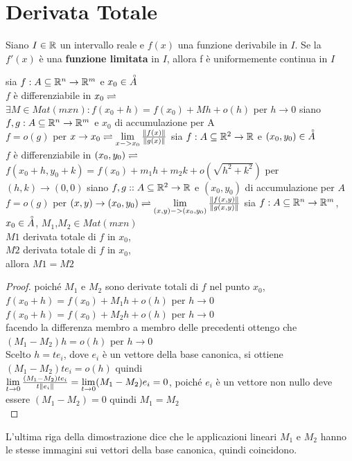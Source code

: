 \section{Derivata Totale}
\begin{proposition} %
	\label{prop:if_df_lim_then_unif_cont}
	Siano $I \in \mathbb{R}$ un intervallo reale e $f(x)$ una funzione derivabile in $I$. Se la $f'(x)$ è una \textbf{funzione limitata} in $I$, allora f è uniformemente continua in $I$
\end{proposition}
sia $f:A\subseteq \mathbb{R}^n\rightarrow \mathbb{R}^m$ e $x_0\in\accentset{\circ}{A}$ \\
$f$ è differenziabile in $x_0\rightleftharpoons$ $\exists M\in Mat(mxn) : f(x_0+h) = f(x_0)+Mh+o(h)$ per $h\rightarrow 0$ 
siano $f,g : A\subseteq \mathbb{R}^n\rightarrow \mathbb{R}^m$ e $x_0$ di accumulazione per A \\
$f=o(g)$ per $x\rightarrow x_0 \rightleftharpoons \lim\limits_{x->x_0}\frac{\left\|f(x)\right\| }{\left\|g(x)\right\| }$
sia $f:A\subseteq \mathbb{R}^2\rightarrow \mathbb{R}$ e $(x_0,y_0)\in\accentset{\circ}{A}$ \\
$f$ è differenziabile in $(x_0,y_0)\rightleftharpoons$ $f(x_0+h,y_0+k) = f(x_0)+m_1h+m_2k+o(\sqrt{h^2+k^2})$ per $(h,k)\rightarrow (0,0)$
siano $f,g : :A\subseteq \mathbb{R}^2\rightarrow \mathbb{R}$ e $(x_0,y_0)$ di accumulazione per $A$ \\
$f=o(g)$ per $(x,y)\rightarrow (x_0,y_0) \rightleftharpoons \lim\limits_{(x,y)->(x_0,y_0)}\frac{\left\|f(x,y)\right\| }{\left\|g(x,y)\right\| }$
sia $f:A\subseteq \mathbb{R}^n\rightarrow \mathbb{R}^m$, $x_0\in\accentset{\circ}{A}$, $M_1$,$M_2\in Mat(mxn)$\\
$M1$ derivata totale di $f$ in $x_0$,\\
$M2$ derivata totale di $f$ in $x_0$,\\
allora $M1=M2$\\
\begin{proof}
	poiché $M_1$ e $M_2$ sono derivate totali di $f$ nel punto $x_0$,\\
	$f(x_0+h) = f(x_0)+M_1h+o(h)$ per $h\rightarrow 0$\\
	$f(x_0+h) = f(x_0)+M_2h+o(h)$ per $h\rightarrow 0$\\
	facendo la differenza membro a membro delle precedenti ottengo che $(M_1-M_2)h=o(h)$ per $h\rightarrow 0$\\
	Scelto $h=te_i$, dove $e_i$ è un vettore della base canonica, si ottiene $(M_1-M_2)te_i=o(h)$ quindi\\
	$\lim\limits_{t\rightarrow 0}\frac{(M_1-M_2)te_i}{t\left\|e_i\right\| } = \lim\limits_{t\rightarrow 0}(M_1-M_2)e_i = 0$, poiché $e_i$ è un vettore non nullo deve essere $(M_1-M_2)=0$ quindi $M_1 = M_2$\\
\end{proof}
\observation
L'ultima riga della dimostrazione dice che le applicazioni lineari $M_1$ e $M_2$ hanno le stesse immagini sui vettori della base canonica, quindi coincidono.

